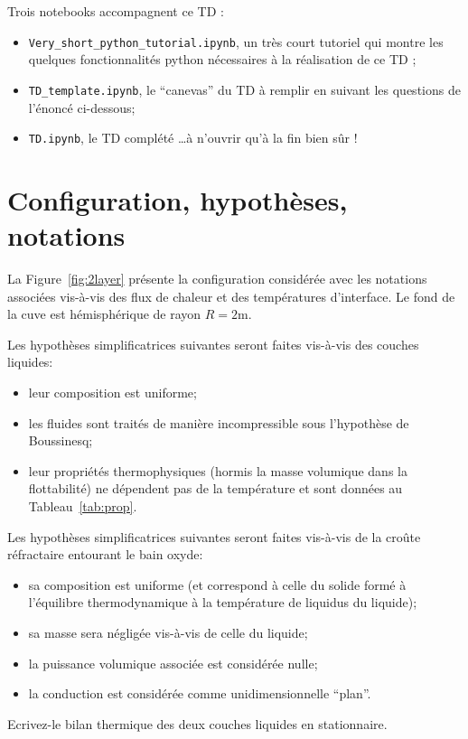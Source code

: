 \documentclass[3p]{elsarticle}
\newcommand{\Fig}[1]{Figure~\ref{fig:#1}}
\newcommand{\Tab}[1]{Tableau~\ref{tab:#1}}
\newcounter{question}
\begin{document}
Trois notebooks accompagnent ce TD :
\begin{itemize}
 \item \texttt{Very\_short\_python\_tutorial.ipynb}, un très court tutoriel qui montre les quelques fonctionnalités python nécessaires à la réalisation de ce TD ;
 \item \texttt{TD\_template.ipynb}, le ``canevas'' du TD à remplir en suivant les questions de l'énoncé ci-dessous;
 \item \texttt{TD.ipynb}, le TD complété \dots à n'ouvrir qu'à la fin bien sûr !
\end{itemize}

\section{Configuration, hypothèses, notations} \label{sect:sci}

La \Fig{2layer} présente la configuration considérée avec les notations associées vis-à-vis des flux de chaleur et des températures d'interface. Le fond de la cuve est hémisphérique de rayon $R=2$m. 

Les hypothèses simplificatrices suivantes seront faites vis-à-vis des couches liquides:
\begin{itemize}
 \item leur composition est uniforme;
 \item les fluides sont traités de manière incompressible sous l'hypothèse de Boussinesq;
 \item leur propriétés thermophysiques (hormis la masse volumique dans la flottabilité) ne dépendent pas de la température et sont données au \Tab{prop}.
\end{itemize}

Les hypothèses simplificatrices suivantes seront faites vis-à-vis de la croûte réfractaire entourant le bain oxyde:
\begin{itemize}
 \item sa composition est uniforme (et correspond à celle du solide formé à l'équilibre thermodynamique à la température de liquidus du liquide);
 \item sa masse sera négligée vis-à-vis de celle du liquide;
 \item la puissance volumique associée est considérée nulle;
 \item la conduction est considérée comme unidimensionnelle ``plan''.
\end{itemize}

Ecrivez-le bilan thermique des deux couches liquides en stationnaire. 
\end{document}
